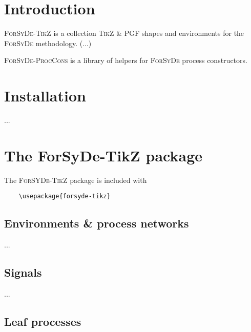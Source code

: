 \documentclass[10pt]{article}
\begin{document}
\maketitle

\begin{abstract}
This document is the reference manual for the \textsc{ForSyDe-TikZ} and \textsc{ForSyDe-ProcCons} packages. A new feature in the library should be reflected and documented in this manual.
\end{abstract}

\section{Introduction}

\textsc{ForSyDe-TikZ} is a collection \textsc{TikZ} \& \textsc{PGF} shapes and environments for the \textsc{ForSyDe} methodology. (...)

\textsc{ForSyDe-ProcCons} is a library of helpers for \textsc{ForSyDe} process constructors.

\section{Installation}

...


\section{The ForSyDe-TikZ package}

The \textsc{ForSYDe-TikZ} package is included with

\begin{verbatim}
	\usepackage{forsyde-tikz}
\end{verbatim}

\subsection{Environments \& process networks}

...

\subsection{Signals}

...

\subsection{Leaf processes}
\end{document}
